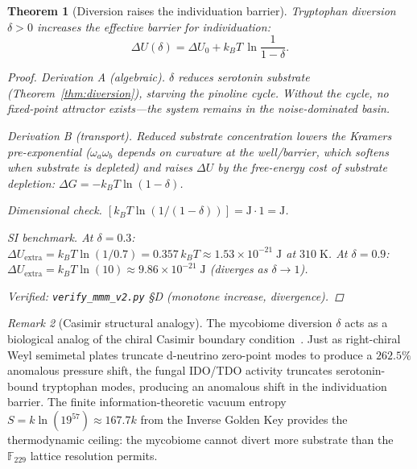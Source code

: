 \documentclass[12pt,oneside]{article}
\theoremstyle{principia}
\newtheorem{theorem}{Theorem}[section]
\theoremstyle{definition}
\theoremstyle{remark}
\newtheorem{remark}[theorem]{Remark}
\begin{document}
\begin{theorem}[Diversion raises the individuation barrier]
\label{thm:decoherence}
Tryptophan diversion $\delta > 0$ increases the effective barrier for
individuation:
\begin{equation}
  \Delta U(\delta) = \Delta U_0 + k_BT\,\ln\frac{1}{1-\delta}.
  \label{eq:barrier}
\end{equation}

\begin{proof}
\emph{Derivation A (algebraic).}
$\delta$ reduces serotonin substrate (Theorem~\ref{thm:diversion}),
starving the pinoline cycle. Without the cycle, no fixed-point attractor
exists---the system remains in the noise-dominated basin.

\emph{Derivation B (transport).}
Reduced substrate concentration lowers the Kramers pre-exponential
($\omega_a\omega_b$ depends on curvature at the well/barrier, which
softens when substrate is depleted) and raises $\Delta U$ by the
free-energy cost of substrate depletion: $\Delta G = -k_BT\ln(1-\delta)$.

\emph{Dimensional check.}
$[k_BT\ln(1/(1-\delta))] = \mathrm{J}\cdot 1 = \mathrm{J}$. \checkmark

\emph{SI benchmark.}
At $\delta = 0.3$: $\Delta U_\mathrm{extra} = k_BT\ln(1/0.7) =
0.357\,k_BT \approx 1.53\times10^{-21}\;\mathrm{J}$ at $310\;\mathrm{K}$.
At $\delta = 0.9$: $\Delta U_\mathrm{extra} = k_BT\ln(10) \approx
9.86\times10^{-21}\;\mathrm{J}$ (diverges as $\delta\to 1$).

Verified: \texttt{verify\_mmm\_v2.py} \S D (monotone increase, divergence).
\qedhere
\end{proof}
\end{theorem}

\begin{remark}[Casimir structural analogy]
The mycobiome diversion $\delta$ acts as a biological analog of the chiral
Casimir boundary condition~\cite{dwm_fst}. Just as right-chiral Weyl
semimetal plates truncate d-neutrino zero-point modes to produce a $262.5\%$
anomalous pressure shift, the fungal IDO/TDO activity truncates
serotonin-bound tryptophan modes, producing an anomalous shift in the
individuation barrier. The finite information-theoretic vacuum entropy
$S = k\ln(19^{57}) \approx 167.7k$ from the Inverse Golden Key provides
the thermodynamic ceiling: the mycobiome cannot divert more substrate
than the $\mathbb{F}_{229}$ lattice resolution permits.
\end{remark}
\end{document}
